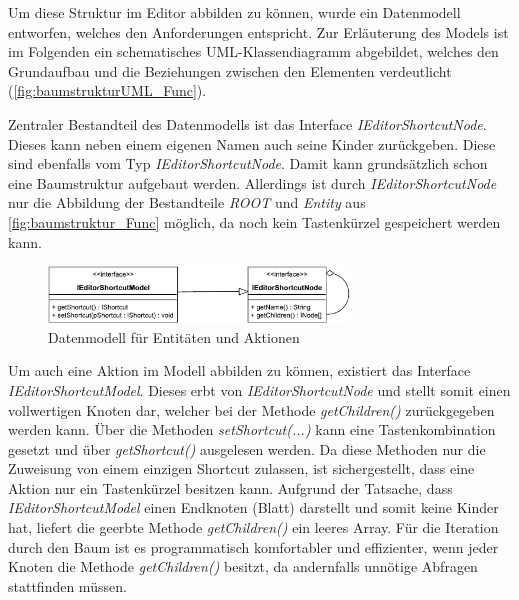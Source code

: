 Um diese Struktur im Editor abbilden zu können, wurde ein Datenmodell entworfen, welches den Anforderungen entspricht. Zur Erläuterung des Models ist im Folgenden ein schematisches UML-Klassendiagramm abgebildet, welches den Grundaufbau und die Beziehungen zwischen den Elementen verdeutlicht (\autoref{fig:baumstrukturUML_Func}).

\vfill

Zentraler Bestandteil des Datenmodells ist das Interface \emph{IEditorShortcutNode}. Dieses kann neben einem eigenen Namen auch seine Kinder zurückgeben. Diese sind ebenfalls vom Typ \emph{IEditorShortcutNode}. Damit kann grundsätzlich schon eine Baumstruktur aufgebaut werden. Allerdings ist durch \emph{IEditorShortcutNode} nur die Abbildung der Bestandteile \emph{ROOT} und \emph{Entity} aus \autoref{fig:baumstruktur_Func} möglich, da noch kein Tastenkürzel gespeichert werden kann.

\vfill

\begin{figure}[H]
	\vspace{20px}
	\centering
	\includegraphics[height=57px]{../graphic/diagrams/CD_Baumstruktur_Functions/Baumstruktur}
	\caption{Datenmodell für Entitäten und Aktionen}
	\label{fig:baumstrukturUML_Func}
\end{figure}

\vfill

Um auch eine Aktion im Modell abbilden zu können, existiert das Interface \emph{IEditorShortcutModel}. Dieses erbt von \emph{IEditorShortcutNode} und stellt somit einen vollwertigen Knoten dar, welcher bei der Methode \emph{getChildren()} zurückgegeben werden kann. Über die Methoden \emph{setShortcut(...)} kann eine Tastenkombination gesetzt und über \emph{getShortcut()} ausgelesen werden. Da diese Methoden nur die Zuweisung von einem einzigen Shortcut zulassen, ist sichergestellt, dass eine Aktion nur ein Tastenkürzel besitzen kann. Aufgrund der Tatsache, dass \emph{IEditorShortcutModel} einen Endknoten (Blatt) darstellt und somit keine Kinder hat, liefert die geerbte Methode \emph{getChildren()} ein leeres Array. Für die Iteration durch den Baum ist es programmatisch komfortabler und effizienter, wenn jeder Knoten die Methode \emph{getChildren()} besitzt, da andernfalls unnötige Abfragen stattfinden müssen.


